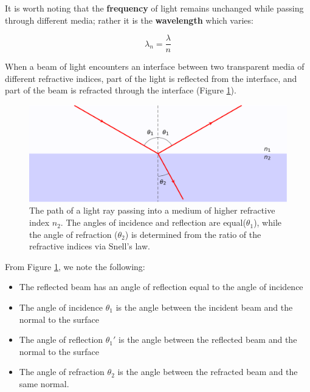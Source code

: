 \documentclass[
]{book}
\providecommand{\tightlist}{%
  \setlength{\itemsep}{0pt}\setlength{\parskip}{0pt}}
\begin{document}
It is worth noting that the \textbf{frequency} of light remains unchanged while passing through different media; rather it is the \textbf{wavelength} which varies:

\begin{equation}
\lambda_n = \frac{\lambda}{n}
\end{equation}

When a beam of light encounters an interface between two transparent media of different refractive indices, part of the light is reflected from the interface, and part of the beam is refracted through the interface (Figure \ref{fig:ch14-reflectionrefraction}).

\begin{figure}

{\centering \includegraphics[width=0.7\linewidth]{visualisations/LaTeX/ch14-reflection-refraction1} 

}

\caption{The path of a light ray passing into a medium of higher refractive index $n_2$. The angles of incidence and reflection are equal($\theta_1$), while the angle of refraction ($\theta_2$) is determined from the ratio of the refractive indices via Snell's law.}\label{fig:ch14-reflectionrefraction}
\end{figure}

From Figure \ref{fig:ch14-reflectionrefraction}, we note the following:

\begin{itemize}
\tightlist
\item
  The reflected beam has an angle of reflection equal to the angle of incidence
\item
  The angle of incidence \(\theta_1\) is the angle between the incident beam and the normal to the surface
\item
  The angle of reflection \(\theta_1'\) is the angle between the reflected beam and the normal to the surface
\item
  The angle of refraction \(\theta_2\) is the angle between the refracted beam and the same normal.
\end{itemize}
\end{document}
